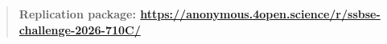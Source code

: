 \documentclass[runningheads]{llncs}
\begin{document}
\begin{abstract}
\textbf{Replication package: 
\url{https://anonymous.4open.science/r/ssbse-challenge-2026-710C/}}





\end{abstract}
\end{document}
